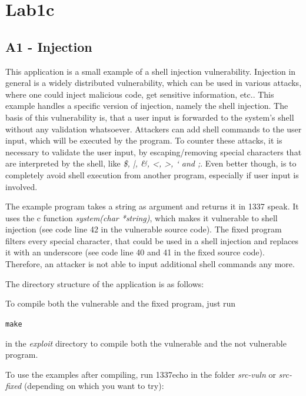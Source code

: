 \documentclass[12pt,a4paper,titlepage,oneside]{scrartcl}
\begin{document}
\section{Lab1c}

\subsection{A1 - Injection}
This application is a small example of a shell injection vulnerability. Injection in general is a widely distributed vulnerability, which can be used
in various attacks, where one could inject malicious code, get sensitive information, etc.. This example handles a specific version of injection, namely the shell injection. The basis of this vulnerability is, that a user input is forwarded to the system's shell without any validation whatsoever. Attackers can add shell commands to the user input, which will be executed by the program. To counter these attacks, it is necessary to validate the user input, by escaping/removing special characters that are interpreted by the shell, like  \textit{\$, |, \&, <, >, ` and ;}. Even better though, is to completely avoid shell execution from another program, especially if user input is involved.

The example program takes a string as argument and returns it in 1337 speak. It uses the c function
\textit{system(char *string)}, which makes it vulnerable to shell injection (see code line 42 in the vulnerable source code). The fixed program filters
every special character, that could be used in a shell injection and replaces it with an
underscore (see code line 40 and 41 in the fixed source code). Therefore, an attacker is not able to input additional shell commands any more.

The directory structure of the application is as follows:


To compile both the vulnerable and the fixed program, just run

\lstinline{make}

in the \textit{exploit} directory to compile both the vulnerable and the not vulnerable program.

To use the examples after compiling, run 1337echo in the folder \textit{src-vuln} or \textit{src-fixed} (depending on which you want to try):
\end{document}
